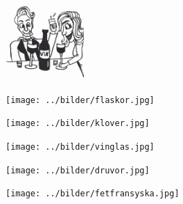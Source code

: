 $  $%
%

\begin{intersong}
\sffamily\bfseries\LARGE{}
\begin{center}
\includegraphics[width=3cm]{../bilder/fardigabilder/BilderTillKapitel/vinvisor.png} 
\end{center}
\end{intersong}
\clearpage

\clearpage

\clearpage

\begin{intersong}
\begin{center}
\texttt{[image: ../bilder/flaskor.jpg]} 
\end{center}
\end{intersong}
\clearpage

%
\begin{intersong}
\begin{center}
\texttt{[image: ../bilder/klover.jpg]} 
\end{center}
\end{intersong}
\clearpage

\begin{intersong}
\begin{center}
\texttt{[image: ../bilder/vinglas.jpg]} 
\end{center}
\end{intersong}
\clearpage

\clearpage

\clearpage

%
\clearpage

\begin{intersong}
\begin{center}
\texttt{[image: ../bilder/druvor.jpg]} 
\end{center}
\end{intersong}
\clearpage

\begin{intersong}
\begin{center}
\texttt{[image: ../bilder/fetfransyska.jpg]} 
\end{center}
\end{intersong}
\clearpage
%
